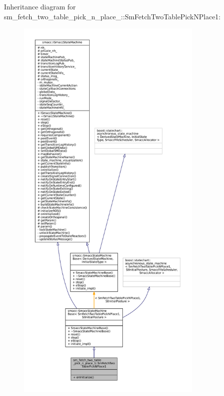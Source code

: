 Inheritance diagram for sm\+\_\+fetch\+\_\+two\+\_\+table\+\_\+pick\+\_\+n\+\_\+place\+\_\+:\+:Sm\+Fetch\+Two\+Table\+Pick\+N\+Place1\+:
\nopagebreak
\begin{figure}[H]
\begin{center}
\leavevmode
\includegraphics[height=550pt]{structsm__fetch__two__table__pick__n__place__1_1_1SmFetchTwoTablePickNPlace1__inherit__graph}
\end{center}
\end{figure}


